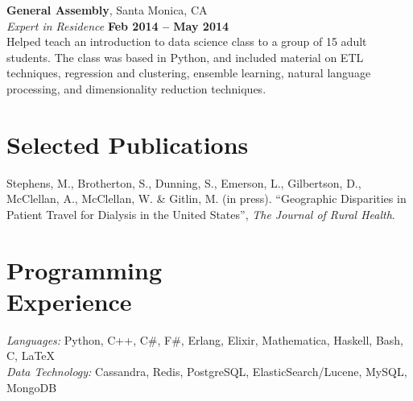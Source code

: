 \documentclass[margin,line]{resume}
\begin{document}
\begin{resume}
    \textbf{General Assembly}, Santa Monica, CA \vspace{2mm}\\\vspace{1mm}%
    \textsl{Expert in Residence} \hfill \textbf{Feb 2014 -- May 2014}\\
    Helped teach an introduction to data science class to a group of 15 adult
    students. The class was based in Python, and included material on ETL
    techniques, regression and clustering, ensemble learning, natural language
    processing, and dimensionality reduction techniques.


   \section{\mysidestyle Selected Publications}
    Stephens, M., Brotherton, S., Dunning, S., Emerson, L., Gilbertson, D., McClellan, A., McClellan, W. \& Gitlin, M. (in press). ``Geographic Disparities in Patient Travel for Dialysis in the United States'', \textsl{The Journal of Rural Health}.
\vspace{-2mm}

    \section{\mysidestyle Programming\\Experience}

    \emph{Languages:} Python, C++, C\#, F\#, Erlang, Elixir, Mathematica, Haskell, Bash, C, \LaTeX \\
    \emph{Data Technology:} Cassandra, Redis, PostgreSQL, ElasticSearch/Lucene, MySQL, MongoDB
\end{resume}
\end{document}
